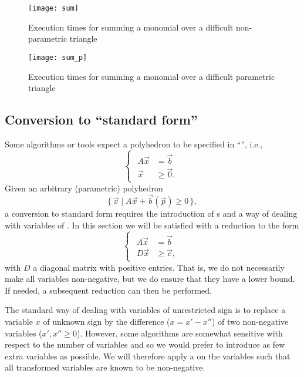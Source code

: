 \begin{figure}
\texttt{[image: sum]}
\caption{Execution times for summing a monomial over a difficult
non-parametric triangle}
\label{f:sum}
\end{figure}

\begin{figure}
\texttt{[image: sum\_p]}
\caption{Execution times for summing a monomial over a difficult
parametric triangle}
\label{f:sum:p}
\end{figure}

\subsection{Conversion to ``standard form''}
\label{s:standard}

Some algorithms or tools expect a polyhedron to be
specified in ``'', i.e.,
\begin{equation}
\label{eq:standard}
\begin{cases}
    \begin{aligned}
A \vec x & = \vec b \\
\vec x & \ge \vec 0
.
    \end{aligned}
\end{cases}
\end{equation}
Given an arbitrary (parametric) polyhedron
\begin{equation}
\label{eq:non-standard}
\{\,
\vec x \mid
A \vec x + \vec b(\vec p) \ge 0
\,\}
,
\end{equation}
a conversion to standard form requires the introduction
of s and a way of dealing with variables
of .
In this section we will be satisfied with a reduction
to the form
\begin{equation}
\label{eq:standard:2}
\begin{cases}
    \begin{aligned}
A \vec x & = \vec b \\
D \vec x & \ge \vec c
,
    \end{aligned}
\end{cases}
\end{equation}
with $D$ a diagonal matrix with positive entries.
That is, we do not necessarily make all variables non-negative,
but we do ensure that they have a lower bound.
If needed, a subsequent reduction can then be performed.

The standard way of dealing with variables of unrestricted
sign is to replace a variable $x$ of unknown sign by the
difference ($x = x' - x''$) of two non-negative variables
($x', x'' \ge 0$).
However, some algorithms are somewhat sensitive with respect
to the number of variables and so we would prefer to introduce
as few extra variables as possible.
We will therefore apply a 
on the variables such that all transformed variables are known
to be non-negative.

